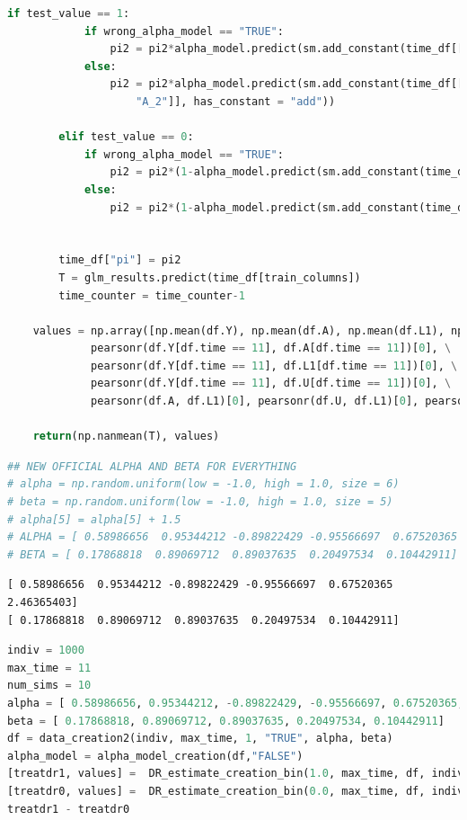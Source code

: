 \begin{lstlisting}[language=Python]
        if test_value == 1: 
            if wrong_alpha_model == "TRUE":
                pi2 = pi2*alpha_model.predict(sm.add_constant(time_df[["L1_3", "A_3"]], has_constant = "add"))
            else:
                pi2 = pi2*alpha_model.predict(sm.add_constant(time_df[["L1", "L1_1", "A_1", \
                    "A_2"]], has_constant = "add"))
        
        elif test_value == 0: 
            if wrong_alpha_model == "TRUE":
                pi2 = pi2*(1-alpha_model.predict(sm.add_constant(time_df[["L1_3", "A_3"]], has_constant = "add")))
            else:
                pi2 = pi2*(1-alpha_model.predict(sm.add_constant(time_df[["L1", "L1_1", "A_1", "A_2"]], has_constant = "add")))
            

        time_df["pi"] = pi2
        T = glm_results.predict(time_df[train_columns])
        time_counter = time_counter-1
    
    values = np.array([np.mean(df.Y), np.mean(df.A), np.mean(df.L1), np.mean(df.U), \
             pearsonr(df.Y[df.time == 11], df.A[df.time == 11])[0], \
             pearsonr(df.Y[df.time == 11], df.L1[df.time == 11])[0], \
             pearsonr(df.Y[df.time == 11], df.U[df.time == 11])[0], \
             pearsonr(df.A, df.L1)[0], pearsonr(df.U, df.L1)[0], pearsonr(df.A, df.U)[0]])
    
    return(np.nanmean(T), values)  
\end{lstlisting}

\begin{lstlisting}[language=Python]
## NEW OFFICIAL ALPHA AND BETA FOR EVERYTHING 
# alpha = np.random.uniform(low = -1.0, high = 1.0, size = 6)
# beta = np.random.uniform(low = -1.0, high = 1.0, size = 5)
# alpha[5] = alpha[5] + 1.5
# ALPHA = [ 0.58986656  0.95344212 -0.89822429 -0.95566697  0.67520365  2.46365403]
# BETA = [ 0.17868818  0.89069712  0.89037635  0.20497534  0.10442911]
\end{lstlisting}

\begin{lstlisting}
[ 0.58986656  0.95344212 -0.89822429 -0.95566697  0.67520365  2.46365403]
[ 0.17868818  0.89069712  0.89037635  0.20497534  0.10442911]
\end{lstlisting}

\begin{lstlisting}[language=Python]
indiv = 1000 
max_time = 11
num_sims = 10
alpha = [ 0.58986656, 0.95344212, -0.89822429, -0.95566697, 0.67520365, 2.46365403]
beta = [ 0.17868818, 0.89069712, 0.89037635, 0.20497534, 0.10442911]
df = data_creation2(indiv, max_time, 1, "TRUE", alpha, beta) 
alpha_model = alpha_model_creation(df,"FALSE")
[treatdr1, values] =  DR_estimate_creation_bin(1.0, max_time, df, indiv, "FALSE", "FALSE", alpha_model)
[treatdr0, values] =  DR_estimate_creation_bin(0.0, max_time, df, indiv, "FALSE", "FALSE", alpha_model)
treatdr1 - treatdr0
\end{lstlisting}

